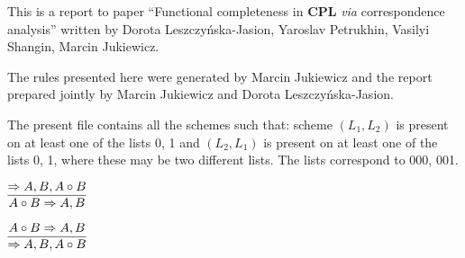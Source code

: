 \documentclass[11pt]{article}
\begin{document}
This is a report to paper ``Functional completeness in \textbf{CPL} \textit{via} correspondence analysis'' written by Dorota Leszczy\'{n}ska-Jasion, 
Yaroslav Petrukhin, Vasilyi Shangin, Marcin Jukiewicz. 

The rules presented here were generated by Marcin Jukiewicz and the report prepared jointly by Marcin Jukiewicz and Dorota Leszczy\'{n}ska-Jasion.

The present file contains all the schemes such that: scheme $(L_1, L_2)$ is present on at least one of the lists 0, 1 and $(L_2, L_1)$ is present on at least one of the lists 0, 1, where these may be two different lists. The lists correspond to 000, 001.

\begin{center}

$\infer{A\circ B\Rightarrow A, B}{\Rightarrow A, B, A\circ B}$
\bigskip

$\infer{\Rightarrow A, B, A\circ B}{A\circ B\Rightarrow A, B}$

\end{center}
\end{document}

